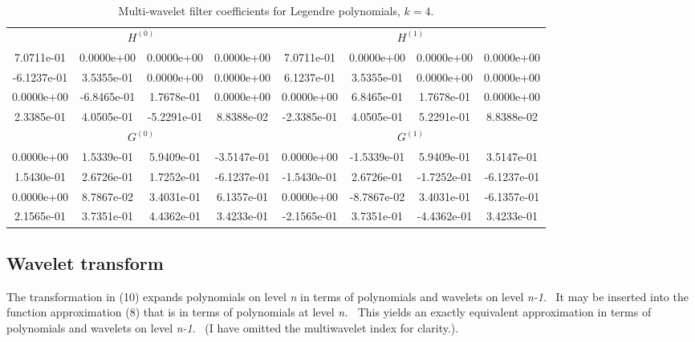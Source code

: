 \documentclass[letterpaper]{book}
\begin{document}
\begin{table}[htdp]
\caption{Multi-wavelet filter coefficients for Legendre polynomials, $k=4$.}
\begin{center}
\begin{tabular}{c c c c|c c c c}
\multicolumn{4}{c|}{$H^{(0)}$} & \multicolumn{4}{|c}{$H^{(1)}$} \\
 7.0711e-01 & 0.0000e+00 & 0.0000e+00 & 0.0000e+00 & 7.0711e-01 & 0.0000e+00 & 0.0000e+00 & 0.0000e+00 \\
-6.1237e-01 & 3.5355e-01 & 0.0000e+00 & 0.0000e+00 & 6.1237e-01 & 3.5355e-01 & 0.0000e+00 & 0.0000e+00 \\
 0.0000e+00 &-6.8465e-01 & 1.7678e-01 & 0.0000e+00 & 0.0000e+00 & 6.8465e-01 & 1.7678e-01 & 0.0000e+00 \\
 2.3385e-01 & 4.0505e-01 &-5.2291e-01 & 8.8388e-02 &-2.3385e-01 & 4.0505e-01 & 5.2291e-01 & 8.8388e-02 \\
 \hline
\multicolumn{4}{c|}{$G^{(0)}$} & \multicolumn{4}{|c}{$G^{(1)}$} \\
 0.0000e+00 & 1.5339e-01 & 5.9409e-01 &-3.5147e-01 & 0.0000e+00 &-1.5339e-01 & 5.9409e-01 & 3.5147e-01 \\
 1.5430e-01 & 2.6726e-01 & 1.7252e-01 &-6.1237e-01 &-1.5430e-01 & 2.6726e-01 &-1.7252e-01 &-6.1237e-01 \\
 0.0000e+00 & 8.7867e-02 & 3.4031e-01 & 6.1357e-01 & 0.0000e+00 &-8.7867e-02 & 3.4031e-01 &-6.1357e-01 \\
 2.1565e-01 & 3.7351e-01 & 4.4362e-01 & 3.4233e-01 &-2.1565e-01 & 3.7351e-01 &-4.4362e-01 & 3.4233e-01 \\
\end{tabular}
\end{center}
\label{default}
\end{table}%

\subsection{Wavelet transform}
The transformation in (10) expands polynomials on level \textit{n }in terms of polynomials and wavelets on level
\textit{n-1}. \ It may be inserted into the function approximation (8) that is in terms of polynomials at level
\textit{n. \ }This yields an exactly equivalent approximation in terms of polynomials and wavelets on level
\textit{n-1}. \ (I have omitted the multiwavelet index for clarity.).
\end{document}
